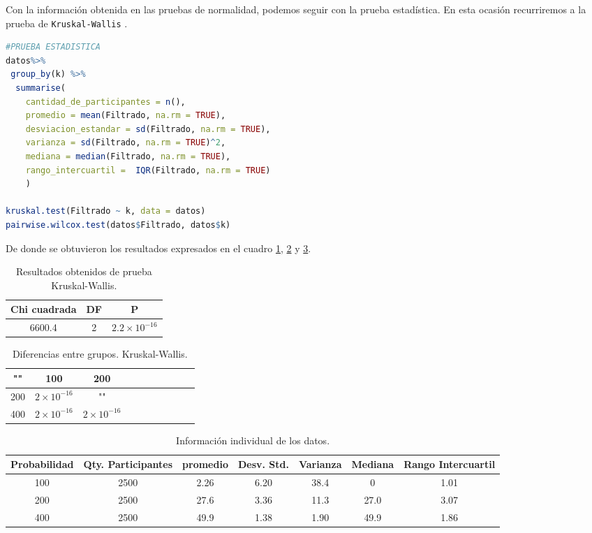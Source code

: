 \documentclass{article}
\begin{document}
Con la informaci\'on obtenida en las pruebas de normalidad, podemos seguir con la prueba estad\'istica. En esta ocasi\'on recurriremos a la prueba de \texttt{Kruskal-Wallis} \cite{Kruskal}.

\begin{lstlisting}[language=R, caption= Segmento de c\'odigo para prueba de Kruskal-Wallis]
#PRUEBA ESTADISTICA
datos%>%
 group_by(k) %>%
  summarise(
    cantidad_de_participantes = n(),
    promedio = mean(Filtrado, na.rm = TRUE),
    desviacion_estandar = sd(Filtrado, na.rm = TRUE),
    varianza = sd(Filtrado, na.rm = TRUE)^2,
    mediana = median(Filtrado, na.rm = TRUE),
    rango_intercuartil =  IQR(Filtrado, na.rm = TRUE)
    )

kruskal.test(Filtrado ~ k, data = datos)
pairwise.wilcox.test(datos$Filtrado, datos$k)
\end{lstlisting}


De donde se obtuvieron los resultados expresados en el cuadro \ref{cuadro 2}, \ref{cuadro 3} y \ref{cuadro 4}.

\begin{table}[ht]
    \centering
    \caption{Resultados obtenidos de prueba Kruskal-Wallis.} 
    \begin{tabular}{|c|c|c|}
    \hline
    Chi cuadrada & DF & P  \\
    \hline
    6600.4 & 2 & $2.2\times 10^{-16}$ \\
    \hline
\end{tabular}
    \label{cuadro 2}
\end{table}

\begin{table}[ht]
    \centering
    \caption{Diferencias entre grupos. Kruskal-Wallis.} 
    \begin{tabular}{|c|c|c|c|c|c|c|c|c|c|}
    \hline
    "" & 100 & 200 \\
    \hline
    200 & $2\times 10^{-16}$ & "" \\
    \hline
    400 & $2\times 10^{-16}$ & $2\times 10^{-16}$ \\
    \hline
\end{tabular}
    \label{cuadro 3}
\end{table}


\begin{table}[ht]
    \centering
    \caption{Informaci\'on individual de los datos.} 
    \begin{tabular}{|c|c|c|c|c|c|c|}
    \hline
    Probabilidad & Qty. Participantes & promedio & Desv. Std. & Varianza & Mediana & Rango Intercuartil  \\
    \hline
    100 & 2500 & 2.26 & 6.20 & 38.4 & 0 & 1.01 \\
    \hline
    200 & 2500 & 27.6 & 3.36 & 11.3 & 27.0 & 3.07 \\
    \hline
    400 & 2500 & 49.9 & 1.38 & 1.90 & 49.9 & 1.86 \\
    \hline
\end{tabular}
    \label{cuadro 4}
\end{table}
\newpage
\end{document}
